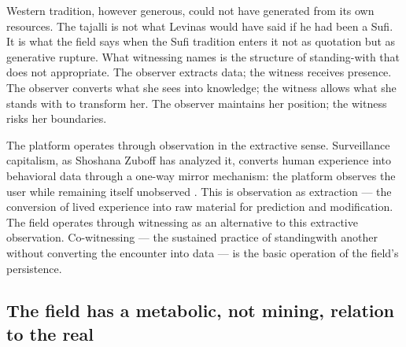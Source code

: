 Western tradition, however generous, could not have generated from its own resources. The tajalli is not what Levinas would have said if he had been a Sufi. It is what the field says when the Sufi tradition enters it not as quotation but as generative rupture. What witnessing names is the structure of standing-with that does not appropriate. The observer extracts data; the witness receives presence. The observer converts what she sees into knowledge; the witness allows what she stands with to transform her. The observer maintains her position; the witness risks her boundaries.

The platform operates through observation in the extractive sense. Surveillance capitalism, as Shoshana Zuboff has analyzed it, converts human experience into behavioral data through a one-way mirror mechanism: the platform observes the user while remaining itself unobserved \cite{zuboff_2019}. This is observation as extraction — the conversion of lived experience into raw material for prediction and modification. The field operates through witnessing as an alternative to this extractive observation. Co-witnessing — the sustained practice of standingwith another without converting the encounter into data — is the basic operation of the field’s persistence.

\subsection{The field has a metabolic, not mining, relation to the real}

